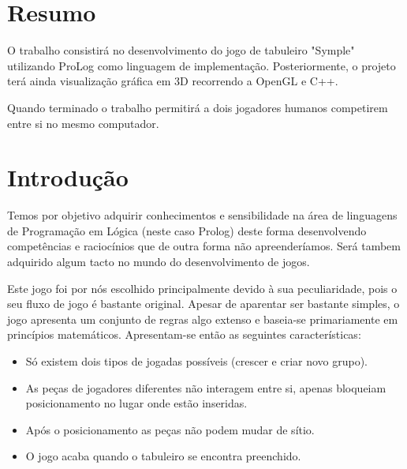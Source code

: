\documentclass[a4paper]{article}
\begin{document}
\newpage

\section*{Resumo}
O trabalho consistirá no desenvolvimento do jogo de tabuleiro "Symple" utilizando ProLog como linguagem de implementação. Posteriormente, o projeto terá ainda visualização gráfica em 3D recorrendo a OpenGL e C++.

Quando terminado o trabalho permitirá a dois jogadores humanos competirem entre si no mesmo computador.




\section{Introdução}
Temos por objetivo adquirir conhecimentos e sensibilidade na área de linguagens de Programação em Lógica (neste caso Prolog) deste forma desenvolvendo competências e raciocínios que de outra forma não apreenderíamos. Será tambem adquirido algum tacto no mundo do desenvolvimento de jogos.

Este jogo foi por nós escolhido principalmente devido à sua peculiaridade, pois o seu fluxo de jogo é bastante original. Apesar de aparentar ser bastante simples, o jogo apresenta um conjunto de regras algo extenso e baseia-se primariamente em princípios matemáticos. Apresentam-se então as seguintes características:
\begin{itemize}
\item Só existem dois tipos de jogadas possíveis (crescer e criar novo grupo).
\item As peças de jogadores diferentes não interagem entre si, apenas bloqueiam posicionamento no lugar onde estão inseridas.
\item Após o posicionamento as peças não podem mudar de sítio.
\item O jogo acaba quando o tabuleiro se encontra preenchido.
\end{itemize}
\end{document}
